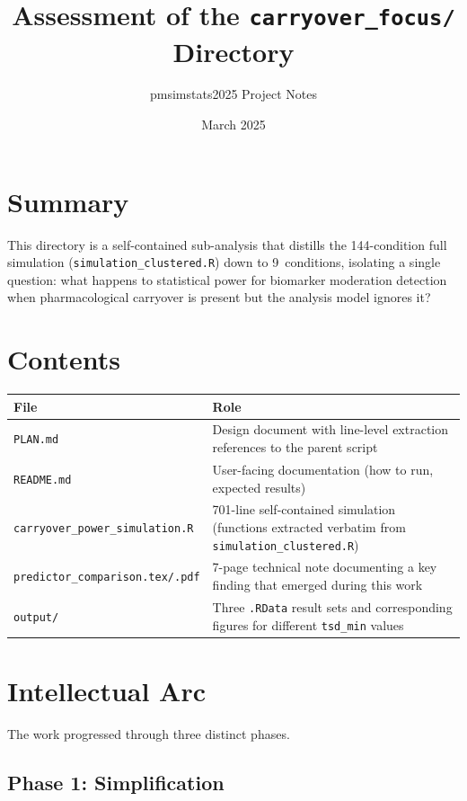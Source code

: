 \documentclass[11pt]{article}
\title{Assessment of the \texttt{carryover\_focus/} Directory}
\author{pmsimstats2025 Project Notes}
\date{March 2025}
\begin{document}
\maketitle

\section{Summary}

This directory is a self-contained sub-analysis that distills the
144-condition full simulation (\texttt{simulation\_clustered.R}) down to
9~conditions, isolating a single question: what happens to statistical
power for biomarker moderation detection when pharmacological carryover
is present but the analysis model ignores it?

\section{Contents}

\begin{table}[h]
\centering
\begin{tabular}{@{}lp{10cm}@{}}
\toprule
File & Role \\
\midrule
\texttt{PLAN.md}
  & Design document with line-level extraction references to the
    parent script \\
\texttt{README.md}
  & User-facing documentation (how to run, expected results) \\
\texttt{carryover\_power\_simulation.R}
  & 701-line self-contained simulation (functions extracted verbatim
    from \texttt{simulation\_clustered.R}) \\
\texttt{predictor\_comparison.tex/.pdf}
  & 7-page technical note documenting a key finding that emerged
    during this work \\
\texttt{output/}
  & Three \texttt{.RData} result sets and corresponding figures for
    different \texttt{tsd\_min} values \\
\bottomrule
\end{tabular}
\end{table}

\section{Intellectual Arc}

The work progressed through three distinct phases.

\subsection{Phase 1: Simplification}
\end{document}
